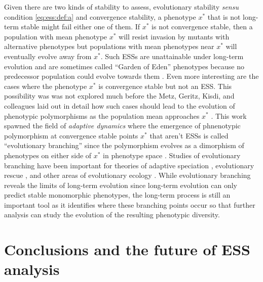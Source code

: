 \documentclass[11pt]{article}
\newcommand{\ess}[1]{#1^*}
\begin{document}
Given there are two kinds of stability to assess, evolutionary stability \textit{sensu} condition \eqref{eq:ess:def:a} and convergence stability, a phenotype $\ess{x}$ that is not long-term stable might fail either one of them. If $\ess{x}$ is not convergence stable, then a population with mean phenotype $\ess{x}$ will resist invasion by mutants with alternative phenotypes but populations with mean phenotypes near $\ess{x}$ will eventually evolve away from $\ess{x}$. Such ESSs are unattainable under long-term evolution and are sometimes called ``Garden of Eden'' phenotypes because no predecessor population could evolve towards them \cite{Hofbauer:Sigmund:1990}. Even more interesting are the cases where the phenotype $\ess{x}$ is convergence stable but not an ESS. This possibility was was not explored much before the Metz, Geritz, Kisdi, and colleagues laid out in detail how such cases should lead to the evolution of phenotypic polymorphisms as the population mean approaches $\ess{x}$ \cite{Metz:Geritz:1996,Geritz:Kisdi:1998}. This work spawned the field of \textit{adaptive dynamics} \cite{Dercole:Rinaldi:2008} where the emergence of phnenotypic polymorphism at convergence stable points $\ess{x}$ that aren't ESSs is called ``evolutionary branching'' since the polymorphism evolves as a dimorphism of phenotypes on either side of $\ess{x}$ in phenotype space \cite{Metz:Geritz:1996,Geritz:Kisdi:1998}. Studies of evolutionary branching have been important for theories of adaptive speciation \cite{Dieckmann:Doebeli:2004,Weissing:Edelaar:2011}, evolutionary rescue \cite{Ferriere:Legendre:2013}, and other areas of evolutionary ecology \cite{Dercole:Rinaldi:2008}. While evolutionary branching reveals the limits of long-term evolution since long-term evolution can only predict stable monomorphic phenotypes, the long-term process is still an important tool as it identifies where these branching points occur so that further analysis can study the evolution of the resulting phenotypic diversity.

\section{Conclusions and the future of ESS analysis}
\end{document}
